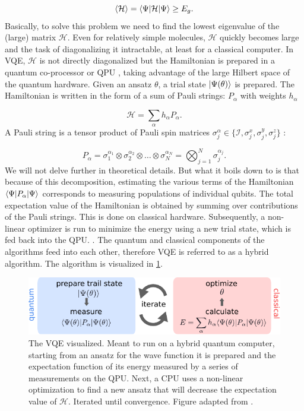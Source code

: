 \begin{equation}\label{eq:VariationalPrinciple}
	\left\langle \mathcal{H} \right\rangle = \langle\Psi\rvert\mathcal{H} \lvert\Psi\rangle \geq E_g.
\end{equation}
Basically, to solve this problem we need to find the lowest eigenvalue of the (large) matrix $\mathcal{H}$. 
Even for relatively simple molecules, $\mathcal{H}$ quickly becomes large and the task of diagonalizing it intractable, at least for a classical computer.
In \ac{VQE}, $\mathcal{H}$ is not directly diagonalized but the Hamiltonian is prepared in a quantum co-processor or \ac{QPU} \cite{Henriet2020,Peruzzo2014}, taking advantage of the large Hilbert space of the quantum hardware.
Given an ansatz $\theta$, a trial state $\lvert\Psi(\theta)\rangle$ is prepared.
The Hamiltonian is written in the form of a sum of Pauli strings: $P_{\alpha}$ with weights $h_{\alpha}$ \cite{McClean2016,Moll2018}

\begin{equation}
	\mathcal{H} = \sum_{\alpha} h_{\alpha} P_{\alpha}.
\end{equation}
A Pauli string is a tensor product of Pauli spin matrices $\sigma_j^{\alpha} \in \{\mathcal{I}, \sigma_j^x, \sigma_j^y, \sigma_j^z\}$ \cite{Griffiths2004}:

\begin{equation}\label{eq:PauliString}
	P_{\alpha} = 
	\sigma_1^{\alpha_1} \otimes \sigma_2^{\alpha_2} \otimes \ldots \otimes \sigma_N^{\alpha_N} = 
	\bigotimes_{j=1}^N \sigma_j^{\alpha_j}.
\end{equation}
We will not delve further in theoretical details. 
But what it boils down to is that because of this decomposition, estimating the various terms of the Hamiltonian $\langle\Psi\rvert P_{\alpha} \lvert\Psi\rangle$ corresponds to measuring populations of individual qubits.
The total expectation value of the Hamiltonian is obtained by summing over contributions of the Pauli strings.
This is done on classical hardware.
Subsequently, a non-linear optimizer is run to minimize the energy using a new trial state, which is fed back into the \ac{QPU}.
\cite{Moll2018}. 
The quantum and classical components of the algorithms feed into each other, therefore \ac{VQE} is referred to as a hybrid algorithm. 
The algorithm is visualized in \cref{fig:VQE}.

\begin{figure}
	\centering
	\includegraphics[width=0.89\linewidth]{figures/VQE.pdf}
	\caption{The \ac{VQE} visualized. 
	Meant to run on a hybrid quantum computer, starting from an ansatz for the wave function it is prepared and the expectation function of its energy measured by a series of measurements on the \ac{QPU}.
	Next, a CPU uses a non-linear optimization to find a new ansatz that will decrease the expectation value of $\mathcal{H}$. Iterated until convergence. Figure adapted from \cite{Moll2018}.}
	\label{fig:VQE}
\end{figure}

